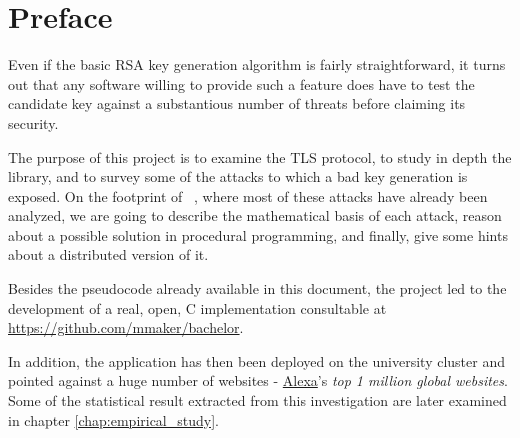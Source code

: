 \chapter{Preface}

Even if the basic RSA key generation algorithm is fairly straightforward, it
turns out that any software willing to provide such a feature does have to test
the candidate key against a substantious number of threats before claiming its
security.

The purpose of this project is to examine the TLS protocol, to study in depth
the \openssl library, and to survey some of the attacks to which a bad key
generation is exposed. On the footprint of ~\cite{20years}, where most of these
attacks have already been analyzed, we are going to describe the mathematical
basis of each attack, reason about a possible solution in procedural
programming, and finally, give some hints about a distributed version of it.

Besides the pseudocode already available in this document, the project led to the
development of a real, open, C implementation consultable at
{\small \url{https://github.com/mmaker/bachelor}}.

In addition, the application has then been deployed on the
university cluster and pointed against a huge number of websites -
\href{http://www.alexa.com/}{Alexa}'s \emph{top 1 million global websites}.
Some of the statistical result extracted from this investigation are later
examined in chapter \ref{chap:empirical_study}.

